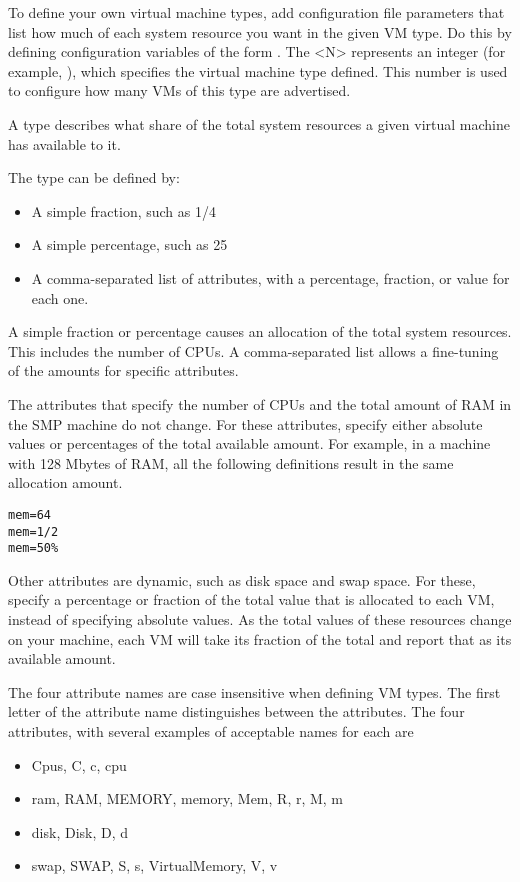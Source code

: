 To define your own virtual machine types, add configuration file
parameters that list how much of each system resource you want in the
given VM type.  Do this by defining configuration
variables of the form
.
The <N> represents an integer (for example, 
), which specifies the virtual 
machine type defined.
This number is used to configure how many VMs of this type
are advertised.

A type describes what share of the total system resources a given
virtual machine has available to it.

The type can be defined by:
\begin{itemize}
  \item A simple fraction, such as 1/4
  \item A simple percentage, such as 25\Percent
  \item A comma-separated list of attributes, with a percentage,
	fraction, or value for each one.
\end{itemize}
A simple fraction or percentage causes an allocation
of the total system resources.
This includes the number of CPUs.
A comma-separated list allows a fine-tuning of
the amounts for specific attributes.

The attributes that specify the number of CPUs
and the total amount of RAM in
the SMP machine do not change.
For these attributes, specify either absolute values or
percentages of the total available amount.  
For example, in a machine with 128 Mbytes of RAM,
all the following definitions result in the same allocation amount.
\begin{verbatim}
mem=64
mem=1/2
mem=50%
\end{verbatim}

Other attributes are dynamic, such as disk space and swap space.
For these, specify a percentage or fraction of the total
value that is allocated to each VM, instead of specifying absolute values.
As the total values of these resources change on your machine, each
VM will take its fraction of the total and report that as its
available amount.

The four attribute names are case insensitive when defining VM types.
The first letter of the attribute name distinguishes between
the attributes.
The four attributes, with several examples of acceptable names for
each are
\begin{itemize}
  \item Cpus, C, c, cpu 
  \item ram, RAM, MEMORY, memory, Mem, R, r, M, m
  \item disk, Disk, D, d
  \item swap, SWAP, S, s, VirtualMemory, V, v
\end{itemize}

